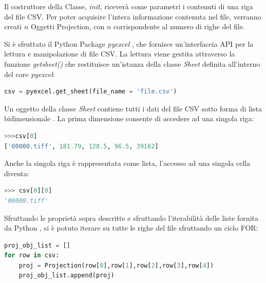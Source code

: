 \documentclass[a4paper,12pt, doubleside]{report}
\begin{document}
               Il costruttore della Classe, \textit{\textunderscore \textunderscore init\textunderscore \textunderscore}, riceverà come parametri i contenuti di una riga del file CSV. Per poter acquisire l'intera informazione contenuta nel file, verranno creati $n$ Oggetti Projection, con $n$ corrispondente al numero di righe del file.
            
            \bigskip
            \par
                Si è sfruttato il Python Package \textit{pyexcel} \cite{pyexcel}, che fornisce un'interfaccia API per la lettura e manipolazione di file CSV. La lettura viene gestita attraverso la funzione \textit{get\textunderscore sheet()} che restituisce un'istanza della classe \textit{Sheet} definita all'interno del core \textit{pyexcel}:
                
                \begin{lstlisting}[language=python, frame=bt]
csv = pyexcel.get_sheet(file_name = 'file.csv')
                \end{lstlisting}
            
            \bigskip
            \par
                Un oggetto della classe \textit{Sheet} contiene tutti i dati del file CSV sotto forma di lista bidimensionale \cite{pyexcel-docs}. La prima dimensione consente di accedere ad una singola riga:
                
                \begin{lstlisting}[language=python, frame=bt]
>>>csv[0]
['00000.tiff', 181.79, 128.5, 96.5, 39162]
                \end{lstlisting}
            
                Anche la singola riga è rappresentata come lista, l'accesso ad una singola cella diventa:
                \begin{lstlisting}[language=python, frame=bt]
>>> csv[0][0]
'00000.tiff'
                \end{lstlisting}
            
            \bigskip
            \par
                Sfruttando le proprietà sopra descritte e sfruttando l'iterabilità delle liste fornita da Python \cite{python-list}, si è potuto iterare su tutte le righe del file sfruttando un ciclo FOR:
            
                \begin{lstlisting}[language=python, frame=bt]
proj_obj_list = []
for row in csv:
    proj = Projection(row[0],row[1],row[2],row[3],row[4])
    proj_obj_list.append(proj)
                \end{lstlisting}
            
\end{document}

